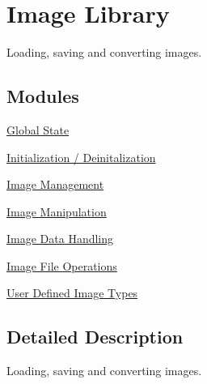 \hypertarget{group___i_l}{\section{Image Library}
\label{group___i_l}
}


Loading, saving and converting images.  


\subsection*{Modules}
\begin{DoxyCompactItemize}
\item 
\hyperlink{group__state}{Global State}
\item 
\hyperlink{group__setup}{Initialization / Deinitalization}
\item 
\hyperlink{group__image__mgt}{Image Management}
\item 
\hyperlink{group__image__manip}{Image Manipulation}
\item 
\hyperlink{group__data}{Image Data Handling}
\item 
\hyperlink{group__file}{Image File Operations}
\item 
\hyperlink{group__register}{User Defined Image Types}
\end{DoxyCompactItemize}


\subsection{Detailed Description}
Loading, saving and converting images. 

